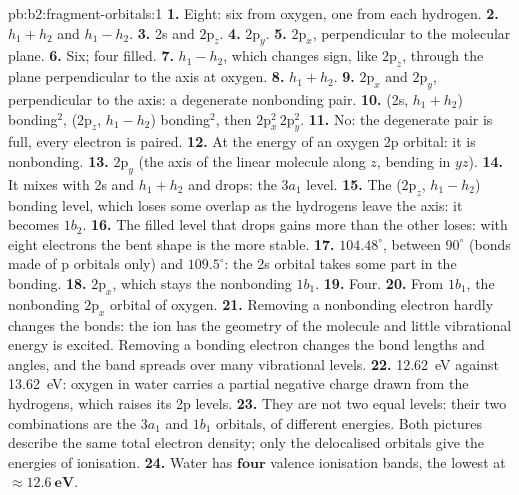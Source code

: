 \begin{solution}{pb:b2:fragment-orbitals:1}
\textbf{1.} Eight: six from oxygen, one from each hydrogen.
\textbf{2.} $h_1 + h_2$ and $h_1 - h_2$.
\textbf{3.} 2s and $2\mathrm p_z$.
\textbf{4.} $2\mathrm p_y$.
\textbf{5.} $2\mathrm p_x$, perpendicular to the molecular plane.
\textbf{6.} Six; four filled.
\textbf{7.} $h_1 - h_2$, which changes sign, like $2\mathrm p_z$, through the plane
perpendicular to the axis at oxygen.
\textbf{8.} $h_1 + h_2$.
\textbf{9.} $2\mathrm p_x$ and $2\mathrm p_y$, perpendicular to the axis: a degenerate
nonbonding pair.
\textbf{10.} (2s, $h_1 + h_2$) bonding$^2$, ($2\mathrm p_z$, $h_1 - h_2$) bonding$^2$, then
$2\mathrm p_x^2\,2\mathrm p_y^2$.
\textbf{11.} No: the degenerate pair is full, every electron is paired.
\textbf{12.} At the energy of an oxygen 2p orbital: it is nonbonding.
\textbf{13.} $2\mathrm p_y$ (the axis of the linear molecule along $z$, bending in $yz$).
\textbf{14.} It mixes with 2s and $h_1 + h_2$ and drops: the $3a_1$ level.
\textbf{15.} The ($2\mathrm p_z$, $h_1 - h_2$) bonding level, which loses some overlap as the
hydrogens leave the axis: it becomes $1b_2$.
\textbf{16.} The filled level that drops gains more than the other loses: with eight
electrons the bent shape is the more stable.
\textbf{17.} $104.48^\circ$, between $90^\circ$ (bonds made of p orbitals only) and $109.5^\circ$:
the 2s orbital takes some part in the bonding.
\textbf{18.} $2\mathrm p_x$, which stays the nonbonding $1b_1$.
\textbf{19.} Four.
\textbf{20.} From $1b_1$, the nonbonding $2\mathrm p_x$ orbital of oxygen.
\textbf{21.} Removing a nonbonding electron hardly changes the bonds: the ion has the
geometry of the molecule and little vibrational energy is excited. Removing a
bonding electron changes the bond lengths and angles, and the band spreads over
many vibrational levels.
\textbf{22.} \qty{12.62}{eV} against \qty{13.62}{eV}: oxygen in water carries a partial
negative charge drawn from the hydrogens, which raises its 2p levels.
\textbf{23.} They are not two equal levels: their two combinations are the $3a_1$ and
$1b_1$ orbitals, of different energies. Both pictures describe the same total
electron density; only the delocalised orbitals give the energies of ionisation.
\textbf{24.} Water has $\boldsymbol{four}$ valence ionisation bands, the lowest at
$\boldsymbol{\approx \qty{12.6}{eV}}$.
\end{solution}
